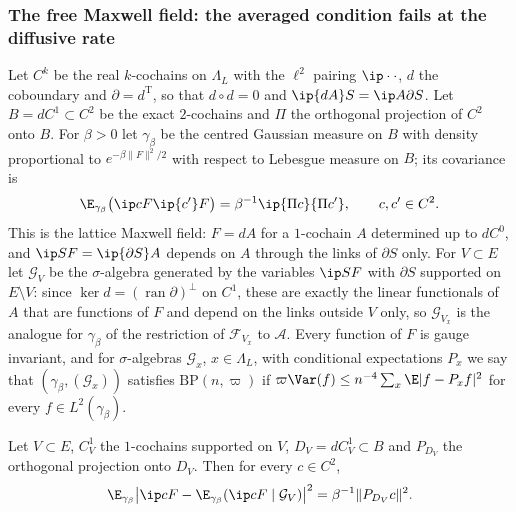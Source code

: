 \subsubsection{The free Maxwell field: the averaged condition fails at the
diffusive rate}

Let $C^k$ be the real $k$-cochains on $\Lambda_L$ with the $\ell^2$ pairing
$\ip\cdot\cdot$, $d$ the coboundary and $\partial=d^{\mathrm T}$, so that
$d\circ d=0$ and $\ip{dA}S=\ip A{\partial S}$. Let $B=dC^1\subset C^2$ be the
exact $2$-cochains and $\Pi$ the orthogonal projection of $C^2$ onto $B$.
For $\beta>0$ let $\gamma_\beta$ be the centred Gaussian measure on $B$ with
density proportional to $e^{-\beta\lVert F\rVert^2/2}$ with respect to
Lebesgue measure on $B$; its covariance is
\[
\E_{\gamma_\beta}\bigl(\ip cF\ip{c'}F\bigr)=\beta^{-1}\ip{\Pi c}{\Pi c'},
\qquad c,c'\in C^2 .
\]
This is the lattice Maxwell field: $F=dA$ for a $1$-cochain $A$ determined
up to $dC^0$, and $\ip SF=\ip{\partial S}A$ depends on $A$ through the links
of $\partial S$ only. For $V\subset E$ let $\mathcal G_V$ be the
$\sigma$-algebra generated by the variables $\ip SF$ with $\partial S$
supported on $E\setminus V$: since $\ker d=(\operatorname{ran}\partial)^\perp$
on $C^1$, these are exactly the linear functionals of $A$ that are functions
of $F$ and depend on the links outside $V$ only, so $\mathcal G_{V_x}$ is
the analogue for $\gamma_\beta$ of the restriction of $\mathcal F_{V_x}$ to
$\mathcal A$. Every function of $F$ is gauge
invariant, and for $\sigma$-algebras $\mathcal G_x$, $x\in\Lambda_L$, with
conditional expectations $P_x$ we say that $(\gamma_\beta,(\mathcal G_x))$
satisfies $\mathrm{BP}(n,\varpi)$ if $\varpi\Var(f)\le n^{-4}\sum_x\E\lvert
f-P_xf\rvert^2$ for every $f\in L^2(\gamma_\beta)$.

\begin{lemma}\label{rD:gaussresp}
Let $V\subset E$, $C^1_V$ the $1$-cochains supported on $V$, $D_V=dC^1_V
\subset B$ and $P_{D_V}$ the orthogonal projection onto $D_V$. Then for
every $c\in C^2$,
\[
\E_{\gamma_\beta}\bigl\lvert\ip cF-\E_{\gamma_\beta}(\ip cF\mid\mathcal G_V)
\bigr\rvert^2=\beta^{-1}\lVert P_{D_V}c\rVert^2 .
\]
\end{lemma}

